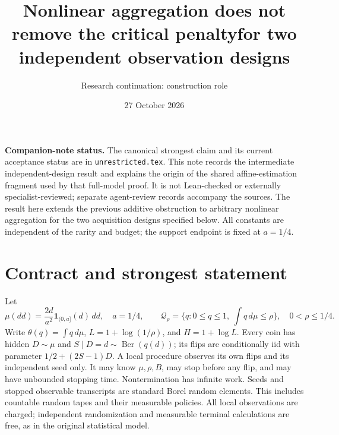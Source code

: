 \documentclass[11pt]{article}
\title{Nonlinear aggregation does not remove the critical penalty\newline for two independent observation designs}
\author{Research continuation: construction role}
\date{27 October 2026}
\begin{document}
\maketitle

\noindent\textbf{Companion-note status.} The canonical strongest claim and its
current acceptance status are in \texttt{unrestricted.tex}. This note records
the intermediate independent-design result and explains the origin of the
shared affine-estimation fragment used by that full-model proof. It is not
Lean-checked or externally specialist-reviewed; separate agent-review records
accompany the sources. The result here extends the previous additive obstruction
to arbitrary nonlinear aggregation for the two acquisition designs specified
below. All constants are independent of the rarity and budget; the support
endpoint is fixed at $a=1/4$.

\section{Contract and strongest statement}
Let
\[
 \mu(dd)=\frac{2d}{a^2}\mathbf1_{(0,a]}(d)\,dd,\quad a=1/4,
 \qquad \mathcal Q_\rho=\{q:0\le q\le1,\ \int q\,d\mu\le\rho\},
 \quad 0<\rho\le1/4.
\]
Write $\theta(q)=\int q\,d\mu$, $L=1+\log(1/\rho)$, and
$H=1+\log L$. Every coin has hidden $D\sim\mu$ and
$S\mid D=d\sim\operatorname{Ber}(q(d))$; its flips are conditionally iid
with parameter $1/2+(2S-1)D$. A local procedure observes its own flips and
its independent seed only. It may know $\mu,\rho,B$, may stop before any
flip, and may have unbounded stopping time. Nontermination has infinite work.
Seeds and stopped observable transcripts are standard Borel random elements.
This includes countable random tapes and their measurable policies.
All local observations are charged; independent randomization and measurable
terminal calculations are free, as in the original statistical model.
\end{document}
